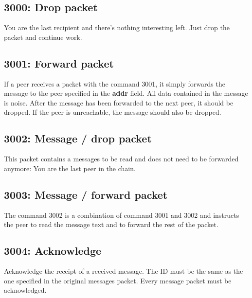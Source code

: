 \subsection{3000: Drop packet}
You are the last recipient and there's nothing interesting left.
Just drop the packet and continue work.
\subsection{3001: Forward packet}
If a peer receives a packet with the command 3001, it simply forwards
the message to the peer specified in the \textbf{addr} field.
All data contained in the message
is noise. After the message has been forwarded to the next peer, it
should be dropped. If the peer is unreachable, the message should also
be dropped.
\subsection{3002: Message / drop packet}
This packet contains a messages to be read and does not need to be forwarded
anymore: You are the last peer in the chain.
\subsection{3003: Message / forward packet}
The command 3002 is a combination of command 3001 and 3002
and instructs the peer to read the message text and to forward the rest of
the packet.
\subsection{3004: Acknowledge}
Acknowledge the receipt of a received message. The ID must be the same as
the one specified in the original messages packet.
Every message packet must be acknowledged.
